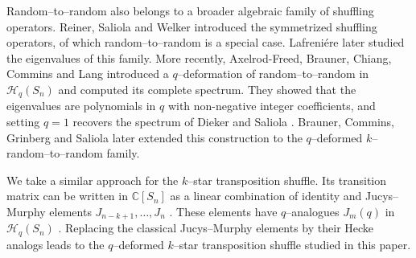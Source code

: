 \documentclass[11pt]{article}
\theoremstyle{plain}  %
\begin{document}
Random--to--random also belongs to a broader algebraic family of shuffling operators. Reiner, Saliola and Welker \cite{ReinerSaliolaWelker2014} introduced the symmetrized shuffling operators, of which random--to--random is a special case. Lafreni{\'e}re \cite{Lafreniere2019} later studied the eigenvalues of this family. More recently, Axelrod-Freed, Brauner, Chiang, Commins and Lang \cite{AxelrodFreedBraunerChiangComminsLang2024} introduced a $q$--deformation of random--to--random in $\mathcal{H}_q(S_n)$ and computed its complete spectrum. They showed that the eigenvalues are polynomials in $q$ with non-negative integer coefficients, and setting $q=1$ recovers the spectrum of Dieker and Saliola \cite{Dieker2018}. Brauner, Commins, Grinberg and Saliola \cite{BCGS} later extended this construction to the $q$--deformed $k$--random--to--random family.



We take a similar approach for the $k$--star transposition shuffle. Its
transition matrix can be written in $\mathbb{C}[S_n]$ as a linear combination
of identity and Jucys--Murphy elements
$J_{n-k+1},\ldots,J_n$ \cite{arfaee2025shuffling}. These elements have
$q$--analogues $J_m(q)$ in $\mathcal{H}_q(S_n)$
\cite{Murphy1992, Ram1997}. Replacing the classical Jucys--Murphy elements by
their Hecke analogs leads to the $q$--deformed $k$--star transposition
shuffle studied in this paper.

\end{document}
